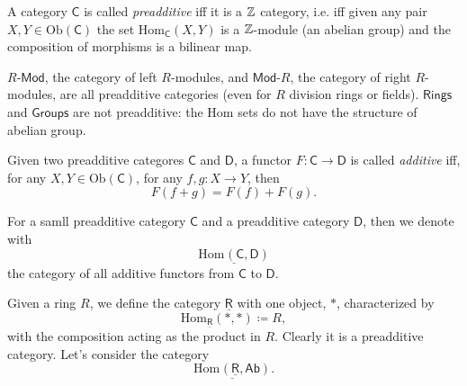 \begin{defn}
	A category $\mathsf{C}$ is called {\em preadditive} iff it is a $\mathbb{Z}$ category, i.e. iff
	given any pair $X,Y \in \mathrm{Ob} \left(\mathsf{C}\right)$ the set $\mathrm{Hom}_{\mathsf{C}} \left( X, Y \right)$ is a $\mathbb{Z}$-module (an abelian group) and the composition of morphisms is a bilinear map.
\end{defn}

\begin{ex}
	$R\text{-}\mathsf{Mod}$, the category of left $R$-modules, and $\mathsf{Mod}\text{-}R$, the category of right $R$-modules, are all preadditive categories (even for $R$ division rings or fields).\newline
	$\mathsf{Rings}$ and $\mathsf{Groups}$ are not preadditive: the Hom sets do not have the structure of abelian group.
\end{ex} 

\begin{defn}
	Given two preadditive categores $\mathsf{C}$ and $\mathsf{D}$, a functor $F\colon \mathsf{C} \to \mathsf{D}$ is called {\em additive} iff, for any $X,Y \in \mathrm{Ob} \left(\mathsf{C}\right)$, for any $f,g\colon X \to Y$, then
	\begin{equation}
		F(f+g) = F(f) + F(g)
	.\end{equation} 
\end{defn}

\begin{rem}
	For a samll preadditive category $\mathsf{C}$ and a preadditive category $\mathsf{D}$, then we denote with
	\begin{equation}
		\underline{\mathrm{Hom}_{} \left( \mathsf{C}, \mathsf{D} \right)}
	\end{equation} 
	the category of all additive functors from $\mathsf{C}$ to $\mathsf{D}$.
\end{rem}

\begin{ex}
	Given a ring $R$, we define the category $\underline{\mathsf{R}}$ with one object, $*$, characterized by
	\begin{equation}
		\mathrm{Hom}_{\underline{\mathsf{R}}} \left(* , * \right) \coloneqq R
	,\end{equation} 
	with the composition acting as the product in $R$.
	Clearly it is a preadditive category.
	Let's consider the category
	\begin{equation}
		\underline{\mathrm{Hom}_{} \left( \underline{\mathsf{R}}, \mathsf{Ab} \right)}
	.\end{equation} 
\end{ex}


